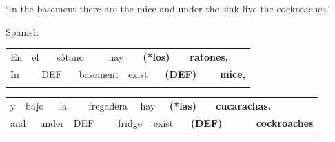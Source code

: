\begin{styleTranslation}
‘In the basement there are the mice and under the sink live the cockroaches.’ 

\end{styleTranslation}

\begin{listWWNumileveli}
\item 

\begin{styleExample}
Spanish

\end{styleExample}

\end{listWWNumileveli}

\begin{tabular}{llllllllllll}
\lsptoprule
En & \multicolumn{2}{l}{el

} & \multicolumn{2}{l}{sótano

} & \multicolumn{2}{l}{hay

} & \multicolumn{2}{l}{{\bfseries (*los)}

} & \multicolumn{2}{l}{{\bfseries ratones,}

} & \\
\multicolumn{2}{l}{In

} & \multicolumn{2}{l}{DEF

} & \multicolumn{2}{l}{basement

} & \multicolumn{2}{l}{exist

} & \multicolumn{2}{l}{{\bfseries (DEF)}

} & \multicolumn{2}{l}{{\bfseries mice,}

}\\
\lspbottomrule
\end{tabular}

\begin{tabular}{llllllllllllll}
\lsptoprule
y & \multicolumn{2}{l}{bajo

} & \multicolumn{2}{l}{la

} & \multicolumn{2}{l}{fregadera

} & \multicolumn{2}{l}{hay

} & \multicolumn{2}{l}{{\bfseries (*las)}

} & \multicolumn{2}{l}{{\bfseries cucarachas.}

} & \\
\multicolumn{2}{l}{and

} & \multicolumn{2}{l}{under

} & \multicolumn{2}{l}{DEF

} & \multicolumn{2}{l}{fridge

} & \multicolumn{2}{l}{exist

} & \multicolumn{2}{l}{{\bfseries (DEF)}

} & \multicolumn{2}{l}{{\bfseries cockroaches}

}\\
\lspbottomrule
\end{tabular}


